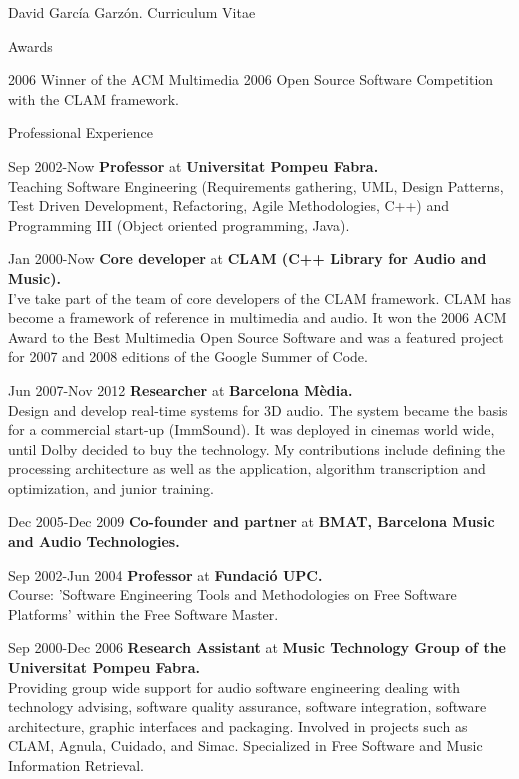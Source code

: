 \documentclass{article}
\begin{document}
\begin{cv}{David García Garzón. Curriculum Vitae}
\begin{cvlist}{Awards}
\item[2006] Winner of the ACM Multimedia 2006 Open Source Software Competition with the CLAM framework.
\end{cvlist}

\begin{cvlist}{Professional Experience}

\item[Sep 2002-Now]
{\bf Professor} at
{\bf Universitat Pompeu Fabra.}\\
Teaching Software Engineering (Requirements gathering, UML, Design Patterns, Test Driven Development, Refactoring, Agile Methodologies, C++) and Programming III (Object oriented programming, Java).

\item[Jan 2000-Now]
{\bf Core developer} at
{\bf CLAM (C++ Library for Audio and Music).}\\
I've take part of the team of core developers of the CLAM framework. CLAM has become a framework of reference in multimedia and audio. It won the 2006 ACM Award to the Best Multimedia Open Source Software and was a featured project for 2007 and 2008 editions of the Google Summer of Code.

\item[Jun 2007-Nov 2012]
{\bf Researcher} at
{\bf Barcelona Mèdia.}\\
Design and develop real-time systems for 3D audio. The system became the basis for a commercial start-up (ImmSound). It was deployed in cinemas world wide, until Dolby decided to buy the technology. My contributions include defining the processing architecture as well as the application, algorithm transcription and optimization, and junior training. 

\item[Dec 2005-Dec 2009]
{\bf Co-founder and partner} at
{\bf BMAT, Barcelona Music and Audio Technologies.}\\


\item[Sep 2002-Jun 2004]
{\bf Professor} at
{\bf Fundació UPC.}\\
Course: 'Software Engineering Tools and Methodologies on Free Software Platforms' within the Free Software Master.

\item[Sep 2000-Dec 2006]
{\bf Research Assistant} at
{\bf Music Technology Group of the Universitat Pompeu Fabra.}\\
Providing group wide support for audio software engineering dealing with technology advising, software quality assurance, software integration, software architecture, graphic interfaces and packaging. Involved in projects such as CLAM, Agnula, Cuidado, and Simac. Specialized in Free Software and Music Information Retrieval.


\end{cvlist}
\end{cv}
\end{document}
